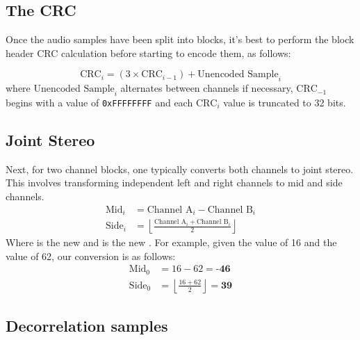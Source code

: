 \clearpage

\subsection{The CRC}

Once the audio samples have been split into blocks,
it's best to perform the block header CRC calculation
before starting to encode them, as follows:

\begin{equation*}
\text{CRC}_i = (3 \times \text{CRC}_{i - 1}) + \text{Unencoded Sample}_i
\end{equation*}
where $\text{Unencoded Sample}_i$ alternates between channels if necessary,
$\text{CRC}_{-1}$ begins with a value of \texttt{0xFFFFFFFF}
and each $\text{CRC}_i$ value is truncated to 32 bits.

\subsection{Joint Stereo}

Next, for two channel blocks, one typically converts both
channels to joint stereo.
This involves transforming independent left and right channels
to mid and side channels.
\begin{align*}
\text{Mid}_i &= \text{Channel A}_i - \text{Channel B}_i \\
\text{Side}_i &= \left\lfloor\frac{\text{Channel A}_i + \text{Channel B}_i}{2}\right\rfloor
\end{align*}
Where  is the new  and  is the new
.
For example, given the  value of 16 and the
 value of 62, our conversion is as follows:
\begin{align*}
\text{Mid}_0 &= 16 - 62 = \textbf{-46} \\
\text{Side}_0 &= \left\lfloor\frac{16 + 62}{2}\right\rfloor = \textbf{39}
\end{align*}

\clearpage

\subsection{Decorrelation samples}

